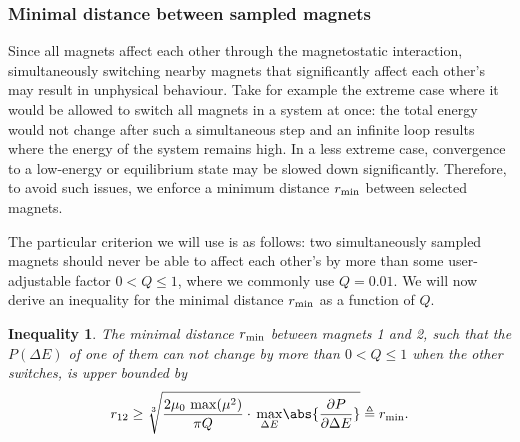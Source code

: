 \subsubsection{Minimal distance between sampled magnets}\label{sec:2:MultiSwitch:rmin} %
Since all magnets affect each other through the magnetostatic interaction, simultaneously switching nearby magnets that significantly affect each other's  may result in unphysical behaviour.
Take for example the extreme case where it would be allowed to switch all magnets in a system at once: the total energy would not change after such a simultaneous step and an infinite loop results where the energy of the system remains high.
In a less extreme case, convergence to a low-energy or equilibrium state may be slowed down significantly.
Therefore, to avoid such issues, we enforce a minimum distance $r_\mathrm{min}$ between selected magnets. \par
The particular criterion we will use is as follows: two simultaneously sampled magnets should never be able to affect each other's  by more than some user-adjustable factor $0 < Q \leq 1$, where we commonly use $Q=0.01$.
We will now derive an inequality for the minimal distance $r_\mathrm{min}$ as a function of $Q$.
\newtheorem{inequality}{Inequality}
\begin{inequality}
	The minimal distance $r_\mathrm{min}$ between magnets 1 and 2, such that the  $P(\Delta E)$ of one of them can not change by more than $0 < Q \leq 1$ when the other switches, is upper bounded by
	\begin{equation}
		\label{eq:2:MultiSwitch_inequality}
		r_{12} \geq \sqrt[3]{\frac{2 \mu_0 \, \max(\mu^2)}{\pi Q} \cdot \, \underset{\Delta E}{\max} \abs{\frac{\partial P}{\partial \Delta E}}} \triangleq \rmin \mathrm{.}
	\end{equation}
\end{inequality}


